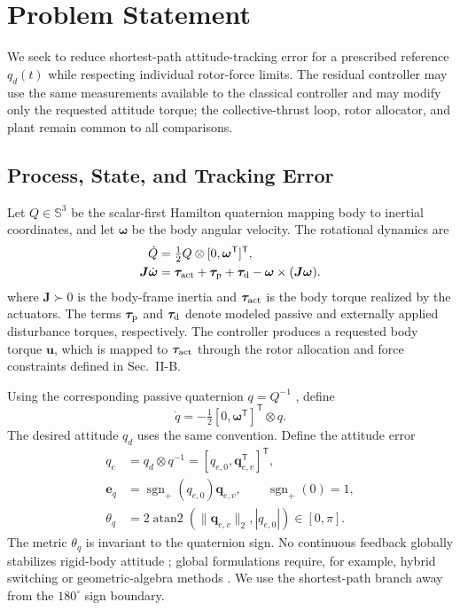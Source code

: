 \documentclass[letterpaper, 10 pt, conference]{ieeeconf}
\newcommand{\T}{^{\mathsf T}}
\newcommand{\sgnp}{\operatorname{sgn}_{+}}
\begin{document}
\section{Problem Statement}
\label{sec:problem}
We seek to reduce shortest-path attitude-tracking error for a prescribed reference $q_d(t)$ while respecting individual rotor-force limits. The residual controller may use the same measurements available to the classical controller and may modify only the requested attitude torque; the collective-thrust loop, rotor allocator, and plant remain common to all comparisons.

\subsection{Process, State, and Tracking Error}

Let $Q\in\mathbb S^3$ be the scalar-first Hamilton quaternion mapping body to
inertial coordinates, and let $\bm\omega$ be the body angular velocity. The
rotational dynamics are \cite{schaub2018amss}
\begin{align}
 \dot Q&=\tfrac12 Q\otimes[0,\bm\omega\T]\T,\\
 \bm J\dot{\bm\omega}&=\bm\tau_{\rm act}+\bm\tau_{\rm p}
       +\bm\tau_{\rm d}-\bm\omega\times(\bm J\bm\omega).
 \label{eq:plant}
\end{align}
where $\bm J\succ0$ is the body-frame inertia and
$\bm\tau_{\rm act}$ is the body torque realized by the actuators.
The terms $\bm\tau_{\rm p}$ and $\bm\tau_{\rm d}$ denote modeled
passive and externally applied disturbance torques, respectively.
The controller produces a requested body torque $\bm u$, which is
mapped to $\bm\tau_{\rm act}$ through the rotor allocation and force
constraints defined in Sec.~II-B.

Using the corresponding passive quaternion $q=Q^{-1}$ \cite{diebel2006quaternion}, define
\begin{equation}
 \dot q=-\tfrac12[0,\bm\omega\T]\T\otimes q.
 \label{eq:passive}
\end{equation}
The desired attitude $q_d$ uses the same convention. Define the attitude error
\begin{align}
 q_e&=q_d\otimes q^{-1}=[q_{e,0},\bm q_{e,v}\T]\T,\\
 \bm e_q&=\sgnp(q_{e,0})\bm q_{e,v},\qquad \sgnp(0)=1,\\
 \theta_q&=2\operatorname{atan2}(\|\bm q_{e,v}\|_2,|q_{e,0}|)
             \in[0,\pi].
 \label{eq:theta}
\end{align}
The metric $\theta_q$ is invariant to the quaternion sign. No continuous feedback globally stabilizes rigid-body attitude \cite{chaturvedi2011rigid}; global formulations require, for example, hybrid switching \cite{mayhew2011hybrid} or geometric-algebra methods \cite{rubioscola2026ga}. We use the shortest-path branch away from the $180^\circ$ sign boundary.
\end{document}
